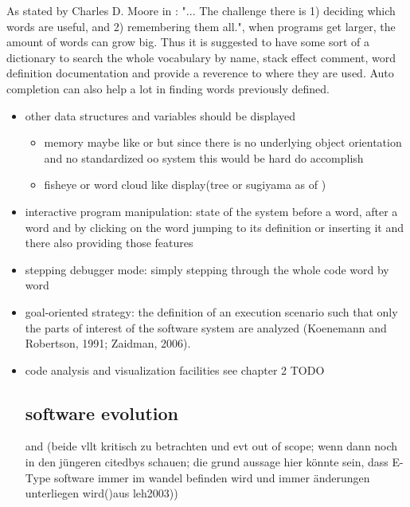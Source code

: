 As stated by \gls{Charles D. Moore} in \cite{Biancuzzi:2009:MPC:1592983}: "... The challenge there is 1) deciding
which words are useful, and 2) remembering them all.", when programs get larger, the amount of words can grow big. Thus it is suggested to have some sort of a dictionary to search the whole vocabulary by name, stack effect comment, word definition documentation and provide a reverence to where they are used. Auto completion can also help a lot in finding words previously defined.

\begin{itemize}

\item other data structures and variables should be displayed
	\begin{itemize}
	\item memory maybe like \cite{ReissProgrammingEnvironments1995} or \cite{Aftandilian:2010:HIH:1879211.1879222} but since there is no underlying object orientation and no standardized oo system this would be hard do accomplish
	\item fisheye or word cloud like display(tree or sugiyama as of \cite{Storey:1997:IVT:857188.857642})
	\end{itemize}
	
\item interactive program manipulation: state of the system before a word, after a word and by clicking on the word jumping to its definition or inserting it and there also providing those features

\item stepping debugger mode: simply stepping through the whole code word by word

\item goal-oriented strategy: the definition of an execution scenario such that only the parts of interest of the software system are analyzed (Koenemann and Robertson, 1991; Zaidman,
2006).

\item code analysis and visualization facilities see chapter 2 TODO


\subsection{software evolution}

\cite{Lehman:1985:PEP:7261} and \cite{Lehman:2003:SEB:950401.950407} (beide vllt kritisch zu betrachten und evt out of scope; wenn dann noch in den jüngeren citedbys schauen; die grund aussage hier könnte sein, dass E-Type software immer im wandel befinden wird und immer änderungen unterliegen wird()aus leh2003))


\end{itemize}

